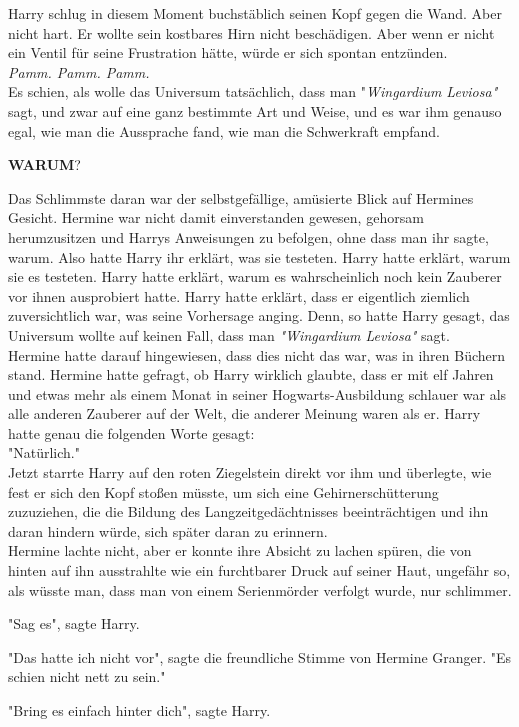 {Harry schlug in diesem Moment buchstäblich seinen Kopf gegen die Wand. Aber nicht hart. Er wollte sein kostbares Hirn nicht beschädigen. Aber wenn er nicht ein Ventil für seine Frustration hätte, würde er sich spontan entzünden.\\ \emph{Pamm. Pamm. Pamm.}\\ Es schien, als wolle das Universum tatsächlich, dass man "\emph{Wingardium Leviosa"} sagt, und zwar auf eine ganz bestimmte Art und Weise, und es war ihm genauso egal, wie man die Aussprache fand, wie man die Schwerkraft empfand.

\textbf{WARUM}?

Das Schlimmste daran war der selbstgefällige, amüsierte Blick auf Hermines Gesicht. Hermine war nicht damit einverstanden gewesen, gehorsam herumzusitzen und Harrys Anweisungen zu befolgen, ohne dass man ihr sagte, warum. Also hatte Harry ihr erklärt, was sie testeten. Harry hatte erklärt, warum sie es testeten. Harry hatte erklärt, warum es wahrscheinlich noch kein Zauberer vor ihnen ausprobiert hatte. Harry hatte erklärt, dass er eigentlich ziemlich zuversichtlich war, was seine Vorhersage anging. Denn, so hatte Harry gesagt, das Universum wollte auf keinen Fall, dass man \emph{"Wingardium Leviosa"} sagt.\\ Hermine hatte darauf hingewiesen, dass dies nicht das war, was in ihren Büchern stand. Hermine hatte gefragt, ob Harry wirklich glaubte, dass er mit elf Jahren und etwas mehr als einem Monat in seiner Hogwarts-Ausbildung schlauer war als alle anderen Zauberer auf der Welt, die anderer Meinung waren als er. Harry hatte genau die folgenden Worte gesagt:\\ "Natürlich."\\ Jetzt starrte Harry auf den roten Ziegelstein direkt vor ihm und überlegte, wie fest er sich den Kopf stoßen müsste, um sich eine Gehirnerschütterung zuzuziehen, die die Bildung des Langzeitgedächtnisses beeinträchtigen und ihn daran hindern würde, sich später daran zu erinnern.\\ Hermine lachte nicht, aber er konnte ihre Absicht zu lachen spüren, die von hinten auf ihn ausstrahlte wie ein furchtbarer Druck auf seiner Haut, ungefähr so, als wüsste man, dass man von einem Serienmörder verfolgt wurde, nur schlimmer.

"Sag es", sagte Harry.

"Das hatte ich nicht vor", sagte die freundliche Stimme von Hermine Granger. "Es schien nicht nett zu sein."

"Bring es einfach hinter dich", sagte Harry.

}

